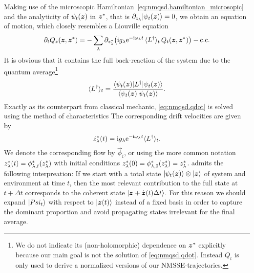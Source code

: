 Making use of the microscopic Hamiltonian~\ref{eq:nmqsd.hamiltonian_microsopic} and the analyticity of $\psitz$ in ${\boldsymbol{z}}^*$, that is $\partial_{z_\lambda} \ket{\psitz} = 0$, we obtain an equation of motion, which closely resembles a Liouville equation
\begin{equation}
  \partial_t Q_z(\zz, \cc\zz) = - \sum_\lambda \partial_{\cc z_\lambda} \big( \ii g_\lambda \exp[-\ii \omega_\lambda t] \, \qmean{\adj L}_t \, Q_t(\zz, \cc\zz) \big) - \mathrm{c.c.}
  \label{eq:nmqsd.qdot}
\end{equation}
It is obvious that it contains the full back-reaction of the system due to the quantum average\footnote{%
  We do not indicate its (non-holomorphic) dependence on ${\boldsymbol{z}}^*$ explicitly because our main goal is not the solution of \autoref{eq:nmqsd.qdot}.
  Instead $Q_t$ is only used to derive a normalized versions of our NMSSE-trajectories.
}
\begin{equation*}
  \qmean{\adj L}_t = \frac{\bra{\psitz} \adj L \ket{\psitz}}{\braket{\psitz}{\psitz}}.
\end{equation*}
Exactly as its counterpart from classical mechanic, \autoref{eq:nmqsd.qdot} is solved using the method of characteristics
The corresponding drift velocities are given by
\begin{equation}
  \cc{\dot z}_\lambda(t) = \ii g_\lambda \exp[-\ii \omega_\lambda t] \qmean{\adj L}_t.
  \label{eq:nmqsd.zdot}
\end{equation}
We denote the corresponding flow by $\vec\phi_t$, or using the more common notation ${z}^*_\lambda(t) = {\phi}^*_{\lambda,t}({z}^*_\lambda)$ with initial conditions ${z}^*_\lambda(0) = {\phi}^*_{\lambda, 0}({z}^*_\lambda) = {z}^*_\lambda$.
 admits the following interpreation:
If we start with a total state $\ket{\psitz}\otimes\ket{\zz}$ of system and environment at time $t$, then the most relevant contribution to the full state at $t + \Delta t$ corresponds to the coherent state $| \boldsymbol{z} + \dot{\boldsymbol{z}}(t) \Delta t \rangle$.
For this reason we should expand $| Psi_t \rangle$ with respect to $| \boldsymbol{z}(t) \rangle$ instead of a fixed basis in order to capture the dominant proportion and avoid propagating states irrelevant for the final average.

